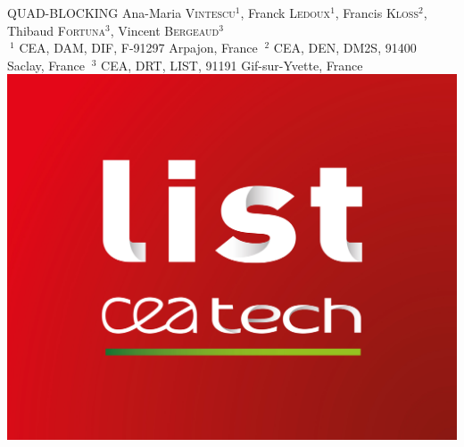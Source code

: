 \documentclass[a0paper,portrait, fontscale=0.30]{baposter}
\begin{document}
\begin{poster}
{{\newline
}
 QUAD-BLOCKING%
\vspace{0.1cm}
}
{%
Ana-Maria \textsc{Vintescu}$^{1}$, 
Franck \textsc{Ledoux}$^{1}$,     
Francis \textsc{Kloss}$^{2}$,
Thibaud \textsc{Fortuna}$^{3}$,
Vincent \textsc{Bergeaud}$^{3}$\\
\smallskip
\small
  $~^1$ CEA, DAM, DIF, F-91297 Arpajon, France \hspace{2em}  
  $~^2$ CEA, DEN, DM2S, 91400 Saclay, France \hspace{2em}  
  $~^3$ CEA, DRT, LIST, 91191 Gif-sur-Yvette, France \hspace{2em}
}
{\includegraphics[scale=0.3]{logo_cea_list}} %
\vspace{-0.5cm}
\end{poster}
\end{document}
